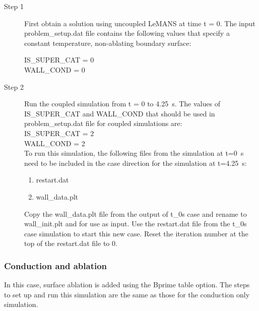 \documentclass[]{article}
\begin{document}
\begin{description}

\item[Step 1] First obtain a solution using uncoupled LeMANS at time t = 0. The input {\selectfont problem\_setup.dat} file contains the following values that specify a constant temperature, non-ablating boundary surface:

\noindent IS\_SUPER\_CAT = 0 \\
WALL\_COND = 0 \\

\item[Step 2] Run the coupled simulation from t = 0 to 4.25~s. The values of IS\_SUPER\_CAT and WALL\_COND that should be used in {\selectfont problem\_setup.dat} file for coupled simulations are:\\

\noindent IS\_SUPER\_CAT = 2 \\
WALL\_COND = 2\\

To run this simulation, the following files from the simulation at t=0~s need to be included in the case direction for the simulation at t=4.25~s:

\begin{enumerate}
\item restart.dat\\
\item wall\_data.plt\\
\end{enumerate}

\noindent Copy the {\selectfont wall\_data.plt} file from the output of {\selectfont t\_0s} case and rename to {\selectfont wall\_init.plt} and for use as input. Use the {\selectfont restart.dat} file from the {\selectfont t\_0s} case simulation to start this new case.  Reset the iteration number at the top of the restart.dat file to 0.

\end{description}

\subsubsection{Conduction and ablation}

In this case, surface ablation is added using the Bprime table option.  The steps to set up and run this simulation are the same as those for the conduction only simulation.
\end{document}
